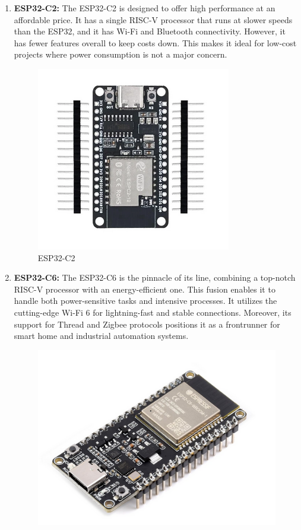 \documentclass[11pt]{article}
\begin{document}
\begin{enumerate}
    \item \textbf{ESP32-C2:} The ESP32-C2 is designed to offer high performance at an affordable price. It has a single RISC-V processor that runs at slower speeds than the ESP32, and it has Wi-Fi and Bluetooth connectivity. However, it has fewer features overall to keep costs down. This makes it ideal for low-cost projects where power consumption is not a major concern.
    \begin{figure}[ht]
        \centering
        \includegraphics[scale = 0.18]{ESP32-C2.png}
        \caption{ESP32-C2}
        \label{fig:ESP32-C2}
    \end{figure}
    \item \textbf{ESP32-C6:} The ESP32-C6 is the pinnacle of its line, combining a top-notch RISC-V processor with an energy-efficient one. This fusion enables it to handle both power-sensitive tasks and intensive processes. It utilizes the cutting-edge Wi-Fi 6 for lightning-fast and stable connections. Moreover, its support for Thread and Zigbee protocols positions it as a frontrunner for smart home and industrial automation systems.
    \begin{figure}[ht]
        \centering
        \includegraphics[scale = 0.18]{ESP32-C6.png}

\end{figure}
\end{enumerate}
\end{document}
